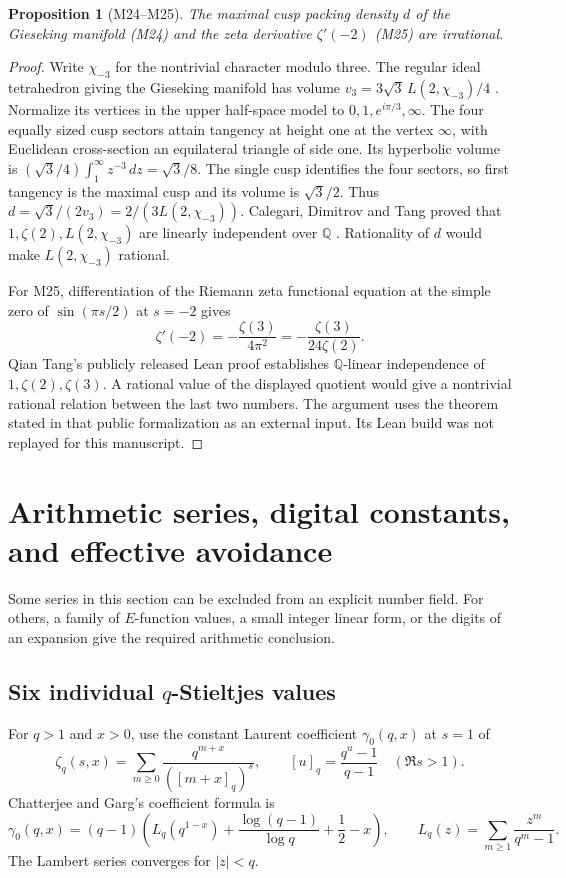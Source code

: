 \documentclass[11pt,a4paper]{article}
\newtheorem{proposition}[theorem]{Proposition}
\theoremstyle{definition}
\theoremstyle{remark}
\begin{document}
\par\hypertarget{cat-M24}{}\label{page:M24}\hypertarget{cat-M25}{}\label{page:M25}
\begin{proposition}[M24--M25]
The maximal cusp packing density $d$ of the Gieseking manifold (M24) and
the zeta derivative $\zeta'(-2)$ (M25) are irrational.
\end{proposition}
\begin{proof}
Write $\chi_{-3}$ for the nontrivial character modulo three. The regular
ideal tetrahedron giving the Gieseking manifold has volume
$v_3=3\sqrt3\,L(2,\chi_{-3})/4$ \cite{mCDT}. Normalize its vertices
in the upper half-space model to $0,1,e^{i\pi/3},\infty$. The four equally
sized cusp sectors attain tangency at height one at the vertex $\infty$,
with Euclidean cross-section an equilateral triangle of side one.
Its hyperbolic volume is
$(\sqrt3/4)\int_1^\infty z^{-3}\,dz=\sqrt3/8$. The single cusp identifies
the four sectors, so first tangency is the maximal cusp and its volume is
$\sqrt3/2$. Thus $d=\sqrt3/(2v_3)=2/(3L(2,\chi_{-3}))$.
Calegari, Dimitrov and Tang proved that $1,\zeta(2),L(2,\chi_{-3})$
are linearly independent over $\mathbb Q$ \cite{mCDT}. Rationality of
$d$ would make $L(2,\chi_{-3})$ rational.

For M25, differentiation of the Riemann zeta functional equation at the
simple zero of $\sin(\pi s/2)$ at $s=-2$ gives
\[
 \zeta'(-2)=-\frac{\zeta(3)}{4\pi^2}
           =-\frac{\zeta(3)}{24\zeta(2)}.
\]
Qian Tang's publicly released Lean proof \cite{mTang} establishes
$\mathbb Q$-linear independence of $1,\zeta(2),\zeta(3)$. A rational
value of the displayed quotient would give a nontrivial rational relation
between the last two numbers. The argument uses the theorem stated in that public formalization as an external input. Its Lean build was not replayed for this manuscript.
\end{proof}



\section{Arithmetic series, digital constants, and effective avoidance}
\label{sec:arith}
Some series in this section can be excluded from an explicit number field.
For others, a family of $E$-function values, a small integer linear form,
or the digits of an expansion give the required arithmetic conclusion.

\subsection{Six individual \texorpdfstring{$q$}{q}-Stieltjes values}
For $q>1$ and $x>0$, use the constant Laurent coefficient
$\gamma_0(q,x)$ at $s=1$ of
\[
 \zeta_q(s,x)=\sum_{m\ge0}
       \frac{q^{m+x}}{([m+x]_q)^s},\qquad
       [u]_q=\frac{q^u-1}{q-1}
       \quad(\Re s>1).
\]
Chatterjee and Garg's coefficient formula \cite[Eq.~(7)]{nCG} is
\[
 \gamma_0(q,x)=(q-1)
 \left(L_q(q^{1-x})+\frac{\log(q-1)}{\log q}+\frac12-x\right),
 \qquad L_q(z)=\sum_{m\ge1}\frac{z^m}{q^m-1}.
\]
The Lambert series converges for $|z|<q$.
\end{document}
